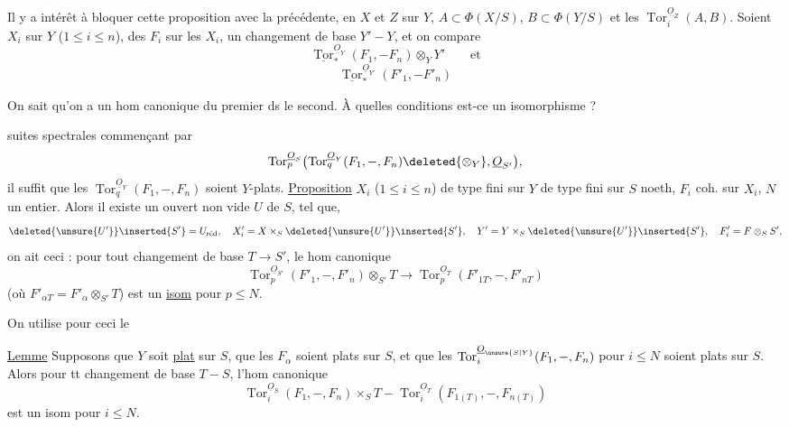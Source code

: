 Il y a intérêt à bloquer cette proposition avec la précédente, en   $X$ et $Z$ sur $Y$,  $A\subset\Phi(X/S)$, $B\subset\Phi(Y/S)$ et les $\operatorname{Tor}_i^{\underline O_Z}(A,B)$.
Soient $X_i$ sur $Y$ ($1\leq i\leq n$), des $F_i$ sur les $X_i$,  un changement de base $Y'-Y$, et on compare
\[
\underline{\operatorname{Tor}}_*^{\underline O_Y}(F_1,-F_n)\otimes_Y Y'\qquad\text{et}
\]
\[
\underline{\operatorname{Tor}}_*^{\underline O_{Y'}}(F'_1,-F'_n)
\]

On sait qu'on a un hom canonique du premier ds le second. À quelles conditions est-ce un isomorphisme ?

  suites spectrales  commençant par
\[
\operatorname{Tor}_p^{\underline O_S}\bigl(\operatorname{Tor}_q^{\underline O_Y}(F_1,-,F_n)\deleted{\otimes_Y},\underline O_{S'}\bigr),
\]
il suffit que les $\operatorname{Tor}_q^{\underline O_Y}(F_1,-,F_n)$ soient $Y$-plats.
\uline{Proposition} $X_i$ ($1\leq i\leq n$) de type fini sur $Y$ de type fini sur $S$ noeth, $F_i$ coh. sur $X_i$, $N$ un entier. Alors il existe un  ouvert non vide $U$ de $S$, tel que,  
\[
\deleted{\unsure{U'}}\inserted{S'}=U_{\text{réd}},\quad X'_i=X\times_S\deleted{\unsure{U'}}\inserted{S'},\quad Y'=Y\times_S\deleted{\unsure{U'}}\inserted{S'},\quad F'_i=F\otimes_S S',
\]
on ait ceci : pour tout changement de base $T\longrightarrow S'$, le hom canonique
\[
\operatorname{Tor}_p^{\underline O_{S'}}(F'_1,-,F'_n)\otimes_{S'}T\longrightarrow\operatorname{Tor}_p^{\underline O_T}(F'_{1T},-,F'_{nT})
\]
(où $F'_{\alpha T}=F'_\alpha\otimes_{S'}T$) est un \uline{isom} pour $p\leq N$.

On utilise pour ceci le

\uline{Lemme}  Supposons que $Y$ soit \uline{plat} sur $S$, que les $F_\alpha$ soient plats sur $S$, et que les $\operatorname{Tor}_i^{\underline O_{\unsure{S|Y}}}(F_1,-,F_n)$ pour $i\leq N$ soient plats sur $S$. Alors pour tt changement de base $T-S$, l'hom canonique
\[
\operatorname{Tor}_i^{\underline O_S}(F_1,-,F_n)\times_S T-\operatorname{Tor}_i^{\underline O_T}(F_{1(T)},-,F_{n(T)})
\]
est un isom pour $i\leq N$.

